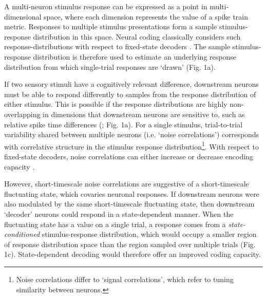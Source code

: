 \documentclass{article}
\begin{document}
A multi-neuron stimulus response can be expressed as a point in multi-dimensional space, where each dimension represents the value of a spike train metric. Responses to multiple stimulus presentations form a sample stimulus-response distribution in this space. Neural coding classically considers such response-distributions with respect to fixed-state decoders \cite{averbeck2006neural, moreno2014information, stringer2019high}. The sample stimulus-response distribution is therefore used to estimate an underlying response distribution from which single-trial responses are `drawn' (Fig. 1a).


If two sensory stimuli have a cognitively relevant difference, downstream neurons must be able to respond differently to samples from the response distribution of either stimulus. This is possible if the response distributions are highly non-overlapping in dimensions that downstream neurons are sensitive to, such as relative spike time differences (\cite{gasparini2006state, branco2010dendritic, branco2011synaptic}; Fig. 1a). For a single stimulus, trial-to-trial variability shared between multiple neurons (i.e. `noise correlations') corresponds with correlative structure in the stimulus response distribution\footnote{Noise correlations differ to `signal correlations', which refer to tuning similarity between neurons.}. With respect to fixed-state decoders, noise correlations can either increase or decrease encoding capacity \cite{averbeck2006neural}.





However, short-timescale noise correlations are suggestive of a short-timescale fluctuating state, which covaries neuronal responses. If downstream neurons were also modulated by the same short-timescale fluctuating state, then downstream `decoder' neurons could respond in a state-dependent manner.
When the fluctuating state has a value on a single trial, a response comes from a \textit{state-conditioned} stimulus-response distribution, which would occupy a smaller region of response distribution space than the region sampled over multiple trials (Fig. 1c). State-dependent decoding would therefore offer an improved coding capacity.
\end{document}
